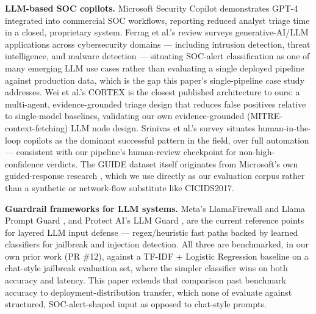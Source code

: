 \documentclass[twocolumn]{svjour3}
\begin{document}
\noindent\textbf{LLM-based SOC copilots.} Microsoft Security Copilot \cite{msft_copilot2024} demonstrates GPT-4 integrated into commercial SOC workflows, reporting reduced analyst triage time in a closed, proprietary system. Ferrag et al.'s review \cite{ferrag2024} surveys generative-AI/LLM applications across cybersecurity domains --- including intrusion detection, threat intelligence, and malware detection --- situating SOC-alert classification as one of many emerging LLM use cases rather than evaluating a single deployed pipeline against production data, which is the gap this paper's single-pipeline case study addresses. Wei et al.'s CORTEX \cite{cortex2025} is the closest published architecture to ours: a multi-agent, evidence-grounded triage design that reduces false positives relative to single-model baselines, validating our own evidence-grounded (MITRE-context-fetching) LLM node design. Srinivas et al.'s survey \cite{srinivas2025survey} situates human-in-the-loop copilots as the dominant successful pattern in the field, over full automation --- consistent with our pipeline's human-review checkpoint for non-high-confidence verdicts. The GUIDE dataset itself originates from Microsoft's own guided-response research \cite{guide2024}, which we use directly as our evaluation corpus rather than a synthetic or network-flow substitute like CICIDS2017.

\noindent\textbf{Guardrail frameworks for LLM systems.} Meta's LlamaFirewall \cite{llamafirewall2025} and Llama Prompt Guard \cite{promptguard2024}, and Protect AI's LLM Guard \cite{llmguard2023}, are the current reference points for layered LLM input defense --- regex/heuristic fast paths backed by learned classifiers for jailbreak and injection detection. All three are benchmarked, in our own prior work (PR \#12), against a TF-IDF + Logistic Regression baseline on a chat-style jailbreak evaluation set, where the simpler classifier wins on both accuracy and latency. This paper extends that comparison past benchmark accuracy to deployment-distribution transfer, which none of \cite{llamafirewall2025,promptguard2024,llmguard2023} evaluate against structured, SOC-alert-shaped input as opposed to chat-style prompts.
\end{document}

